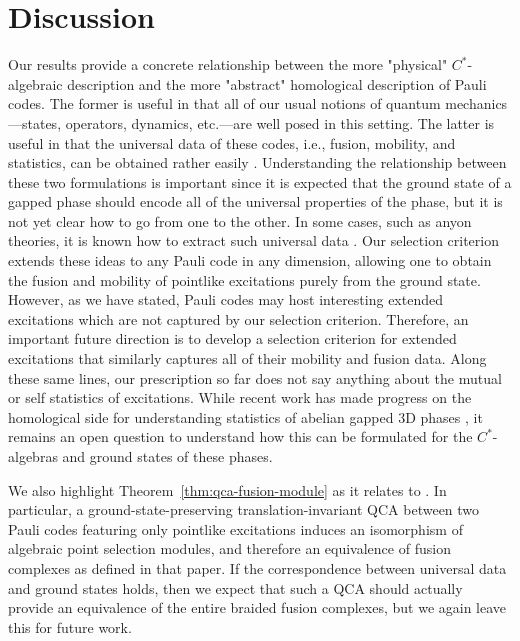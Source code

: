 \documentclass[11pt]{amsart}
\begin{document}
\section{Discussion}
Our results provide a concrete relationship between the more "physical" $C^*$-algebraic description and the more "abstract" homological description of Pauli codes. The former is useful in that all of our usual notions of quantum mechanics---states, operators, dynamics, etc.---are well posed in this setting. The latter is useful in that the universal data of these codes, i.e., fusion, mobility, and statistics, can be obtained rather easily \cite{Shirley_2026_BFC}. Understanding the relationship between these two formulations is important since it is expected that the ground state of a gapped phase should encode all of the universal properties of the phase, but it is not yet clear how to go from one to the other. In some cases, such as anyon theories, it is known how to extract such universal data \cite{shi_kato_kim_2020}. Our selection criterion extends these ideas to any Pauli code in any dimension, allowing one to obtain the fusion and mobility of pointlike excitations purely from the ground state. However, as we have stated, Pauli codes may host interesting extended excitations which are not captured by our selection criterion. Therefore, an important future direction is to develop a selection criterion for extended excitations that similarly captures all of their mobility and fusion data. Along these same lines, our prescription so far does not say anything about the mutual or self statistics of excitations. While recent work has made progress on the homological side for understanding statistics of abelian gapped 3D phases \cite{Shirley_2026_BFC}, it remains an open question to understand how this can be formulated for the $C^*$-algebras and ground states of these phases.  
\par We also highlight Theorem~\ref{thm:qca-fusion-module} as it relates to \cite{Shirley_2026_BFC}. In particular, a ground-state-preserving translation-invariant QCA between two Pauli codes featuring only pointlike excitations induces an isomorphism of algebraic point selection modules, and therefore an equivalence of fusion complexes as defined in that paper. If the correspondence between universal data and ground states holds, then we expect that such a QCA should actually provide an equivalence of the entire braided fusion complexes, but we again leave this for future work. 
\appendix
\end{document}
